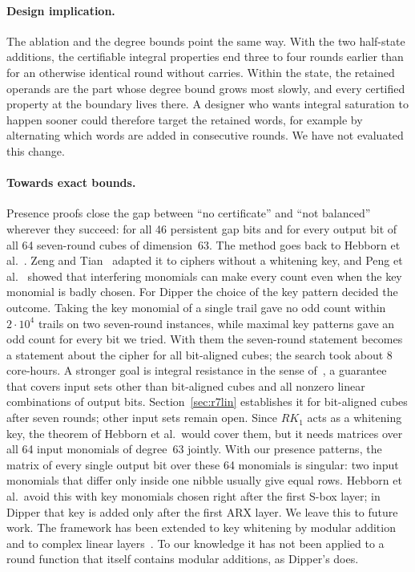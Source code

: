\documentclass[pdflatex,sn-mathphys-num]{sn-jnl}
\theoremstyle{thmstyleone}
\theoremstyle{thmstylethree}
\theoremstyle{thmstyletwo}
\begin{document}
\paragraph{Design implication.} The ablation and the degree bounds point the same way. With the two half-state additions, the certifiable integral properties end three to four rounds earlier than for an otherwise identical round without carries. Within the state, the retained operands are the part whose degree bound grows most slowly, and every certified property at the boundary lives there. A designer who wants integral saturation to happen sooner could therefore target the retained words, for example by alternating which words are added in consecutive rounds. We have not evaluated this change.

\paragraph{Towards exact bounds.} Presence proofs close the gap between ``no certificate'' and ``not balanced'' wherever they succeed: for all 46 persistent gap bits and for every output bit of all 64 seven-round cubes of dimension~63. The method goes back to Hebborn et al.~\cite{hebborn2020,hebborn2021}. Zeng and Tian~\cite{zeng2024} adapted it to ciphers without a whitening key, and Peng et al.~\cite{peng2026} showed that interfering monomials can make every count even when the key monomial is badly chosen. For Dipper the choice of the key pattern decided the outcome. Taking the key monomial of a single trail gave no odd count within $2\cdot10^4$ trails on two seven-round instances, while maximal key patterns gave an odd count for every bit we tried. With them the seven-round statement becomes a statement about the cipher for all bit-aligned cubes; the search took about 8 core-hours. A stronger goal is integral resistance in the sense of~\cite{hebborn2021}, a guarantee that covers input sets other than bit-aligned cubes and all nonzero linear combinations of output bits. Section~\ref{sec:r7lin} establishes it for bit-aligned cubes after seven rounds; other input sets remain open. Since $RK_1$ acts as a whitening key, the theorem of Hebborn et al.\ would cover them, but it needs matrices over all 64 input monomials of degree~63 jointly. With our presence patterns, the matrix of every single output bit over these 64 monomials is singular: two input monomials that differ only inside one nibble usually give equal rows. Hebborn et al.\ avoid this with key monomials chosen right after the first S-box layer; in Dipper that key is added only after the first ARX layer. We leave this to future work. The framework has been extended to key whitening by modular addition~\cite{beierle2025} and to complex linear layers~\cite{gerhalter2026}. To our knowledge it has not been applied to a round function that itself contains modular additions, as Dipper's does.
\end{document}
